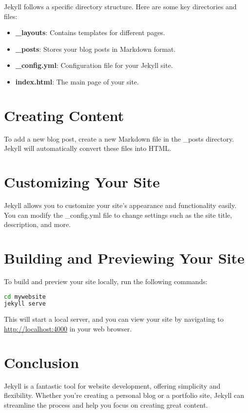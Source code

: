\documentclass{book}
\begin{document}
Jekyll follows a specific directory structure. Here are some key directories and files:

\begin{itemize}
    \item \textbf{\_layouts}: Contains templates for different pages.
    \item \textbf{\_posts}: Stores your blog posts in Markdown format.
    \item \textbf{\_config.yml}: Configuration file for your Jekyll site.
    \item \textbf{index.html}: The main page of your site.
\end{itemize}

\section*{Creating Content}

To add a new blog post, create a new Markdown file in the \_posts directory. Jekyll will automatically convert these files into HTML.

\section*{Customizing Your Site}

Jekyll allows you to customize your site's appearance and functionality easily. You can modify the \_config.yml file to change settings such as the site title, description, and more.

\section*{Building and Previewing Your Site}

To build and preview your site locally, run the following commands:

\begin{lstlisting}[language=bash]
cd mywebsite
jekyll serve
\end{lstlisting}

This will start a local server, and you can view your site by navigating to \url{http://localhost:4000} in your web browser.

\section*{Conclusion}

Jekyll is a fantastic tool for website development, offering simplicity and flexibility. Whether you're creating a personal blog or a portfolio site, Jekyll can streamline the process and help you focus on creating great content.
\end{document}
